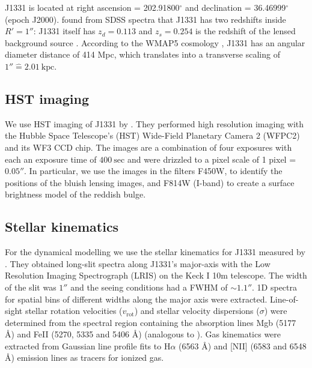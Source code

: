 \documentclass[useAMS,usenatbib]{mnras}
\begin{document}
J1331 is located at right ascension = 202.91800$^\circ$ and declination = 36.46999$^\circ$ (epoch J2000). \citet{SWELLSI} found from SDSS spectra that J1331 has two redshifts inside $R'=1''$: J1331 itself has $z_d = 0.113$ and $z_s = 0.254$ is the redshift of the lensed background source \citep{SWELLSIII}. According to the WMAP5 cosmology \citep{WMAP5cosm}, J1331 has an angular diameter distance of 414 Mpc, which translates into a transverse scaling of $1'' \hat{=} 2.01~\text{kpc}$.

\subsection{HST imaging}

We use HST imaging of J1331 by \citet{SWELLSI}. They performed high resolution imaging with the Hubble Space Telescope's (HST) Wide-Field Planetary Camera 2 (WFPC2) and its WF3 CCD chip. The images are a combination of four exposures with each an exposure time of $400~\text{sec}$ and were drizzled to a pixel scale of 1 pixel = $0.05''$. In particular, we use the images in the filters F450W, to identify the positions of the bluish lensing images, and F814W (I-band) to create a surface brightness model of the reddish bulge.

\subsection{Stellar kinematics} \label{sec:data_kinematics}

For the dynamical modelling we use the stellar kinematics for J1331 measured by \citet{SWELLSV}. They obtained long-slit spectra along J1331's major-axis with the Low Resolution Imaging Spectrograph (LRIS) on the Keck I 10m telescope. The width of the slit was $1''$ and the seeing conditions had a FWHM of $\sim 1.1''$. 1D spectra for spatial bins of different widths along the major axis were extracted. Line-of-sight stellar rotation velocities ($v_\text{rot}$) and stellar velocity dispersions ($\sigma$) were determined from the spectral region containing the absorption lines Mgb (5177 \AA) and FeII (5270, 5335 and 5406 \AA) (analogous to \citealt{SWELLSII}). Gas kinematics were extracted from Gaussian line profile fits to H$\alpha$ (6563 \AA) and [NII] (6583 and 6548 \AA) emission lines as tracers for ionized gas.
\end{document}
